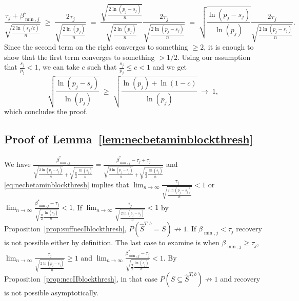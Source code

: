 \documentclass[aos]{imsart}
\theoremstyle{plain}
\begin{document}
\begin{supplement}
$$
\frac{\tau_j+\beta^\star_{\min,j}}{\sqrt{\tfrac{2\ln(s_j/c)}{n}}}\;\geq\;\frac{2\tau_j}{\sqrt{\tfrac{2\ln(p_j)}{n}}}\;=\;\frac{\sqrt{\tfrac{2\ln(p_j-s_j)}{n}}}{\sqrt{\tfrac{2\ln(p_j)}{n}}}\frac{2\tau_j}{\sqrt{\tfrac{2\ln(p_j-s_j)}{n}}}\;=\;\sqrt{\frac{\ln(p_j-s_j)}{\ln(p_j)}}\frac{2\tau_j}{\sqrt{\tfrac{2\ln(p_j-s_j)}{n}}}.
$$
Since the second term on the right converges to something $\geq 2$, it is enough to show that the first term converges to something $>1/2$. Using our assumption that $\tfrac{s_j}{p_j}<1$, we can take $c$ such that $\tfrac{s_j}{p_j}\leq c<1$ and we get
$$
\sqrt{\frac{\ln(p_j-s_j)}{\ln(p_j)}}\;\geq\;\sqrt{\frac{\ln(p_j)+\ln(1-c)}{\ln(p_j)}}\;\to\;1,
$$
which concludes the proof.

\subsection{Proof of Lemma~\ref{lem:necbetaminblockthresh}}
    We have $\frac{\beta_{\min,j}^*}{\sqrt{\tfrac{2\ln(p_j-s_j)}{n}}+\sqrt{\tfrac{\pi}{2}\tfrac{\ln(s_j)}{n}}}= \frac{\beta_{\min,j}^*-\tau_j+\tau_j}{\sqrt{\tfrac{2\ln(p_j-s_j)}{n}}+\sqrt{\tfrac{\pi}{2}\tfrac{\ln(s_j)}{n}}}$ and \eqref{eq:necbetaminblockthresh} implies that $\lim_{n\to \infty}\frac{\tau_j}{\sqrt{\tfrac{2\ln(p_j-s_j)}{n}}} <1$ or $\lim_{n\to \infty}\frac{\beta_{\min,j}^*-\tau_j}{\sqrt{\tfrac{\pi}{2}\tfrac{\ln(s_j)}{n}}} <1$. 
    If $\lim_{n\to \infty}\frac{\tau_j}{\sqrt{\tfrac{2\ln(p_j-s_j)}{n}}} <1$ by Proposition~\ref{prop:suffnecIblockthresh}, $P(\hat{S}^{T,b} = S)\not \to 1$. If $\beta_{\min,j}<\tau_j$ recovery is not possible either by definition. 
    The last case to examine is when $\beta_{\min,j}\geq\tau_j$, $\lim_{n\to \infty}\frac{\tau_j}{\sqrt{\tfrac{2\ln(p_j-s_j)}{n}}} \geq 1$ and $\lim_{n\to \infty}\frac{\beta_{\min,j}^*-\tau_j}{\sqrt{\tfrac{\pi}{2}\tfrac{\ln(s_j)}{n}}} <1$. By Proposition~\ref{prop:necIIblockthresh}, in that case $P(S \subseteq \hat{S}^{T,b} )\not \to 1$ and recovery is not possible asymptotically.


\end{supplement}
\end{document}
